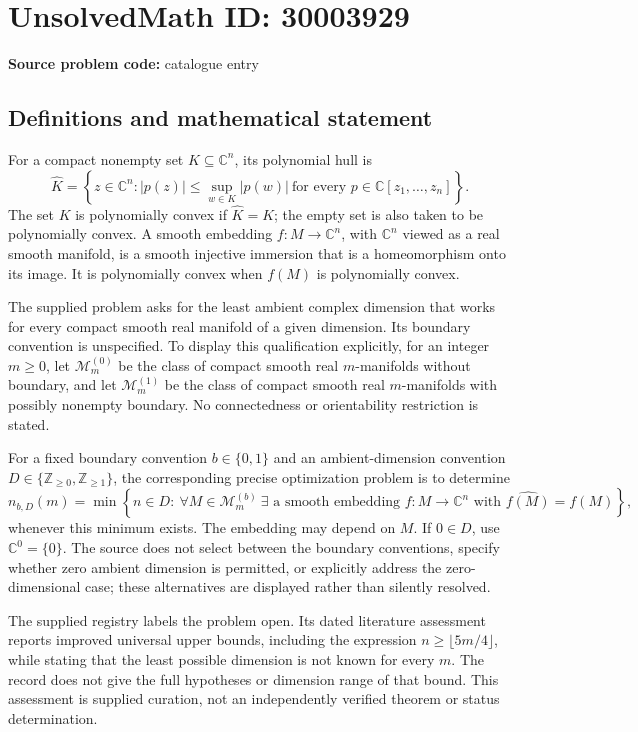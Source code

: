 \documentclass[11pt]{article}
\newcommand{\Z}{\mathbb{Z}}
\newcommand{\C}{\mathbb{C}}
\begin{document}
\section*{UnsolvedMath ID: 30003929}
\textbf{Source problem code:} catalogue entry
\subsection{Definitions and mathematical statement}
For a compact nonempty set \(K\subseteq\C^n\), its polynomial hull is
\[
\widehat K=\left\{z\in\C^n: |p(z)|\leq\sup_{w\in K}|p(w)|\ \text{for every }p\in\C[z_1,\ldots,z_n]\right\}.
\]
The set \(K\) is polynomially convex if \(\widehat K=K\); the empty set is also taken to be polynomially convex. A smooth embedding \(f:M\to\C^n\), with \(\C^n\) viewed as a real smooth manifold, is a smooth injective immersion that is a homeomorphism onto its image. It is polynomially convex when \(f(M)\) is polynomially convex.

The supplied problem asks for the least ambient complex dimension that works for every compact smooth real manifold of a given dimension. Its boundary convention is unspecified. To display this qualification explicitly, for an integer \(m\geq0\), let \(\mathcal M_m^{(0)}\) be the class of compact smooth real \(m\)-manifolds without boundary, and let \(\mathcal M_m^{(1)}\) be the class of compact smooth real \(m\)-manifolds with possibly nonempty boundary. No connectedness or orientability restriction is stated.

For a fixed boundary convention \(b\in\{0,1\}\) and an ambient-dimension convention \(D\in\{\Z_{\geq0},\Z_{\geq1}\}\), the corresponding precise optimization problem is to determine
\[
n_{b,D}(m)=\min\left\{n\in D:\ \forall M\in\mathcal M_m^{(b)}\ \exists\text{ a smooth embedding }f:M\to\C^n\text{ with }\widehat{f(M)}=f(M)\right\},
\]
whenever this minimum exists. The embedding may depend on \(M\). If \(0\in D\), use \(\C^0=\{0\}\). The source does not select between the boundary conventions, specify whether zero ambient dimension is permitted, or explicitly address the zero-dimensional case; these alternatives are displayed rather than silently resolved.

The supplied registry labels the problem open. Its dated literature assessment reports improved universal upper bounds, including the expression \(n\geq\lfloor5m/4\rfloor\), while stating that the least possible dimension is not known for every \(m\). The record does not give the full hypotheses or dimension range of that bound. This assessment is supplied curation, not an independently verified theorem or status determination.
\end{document}
